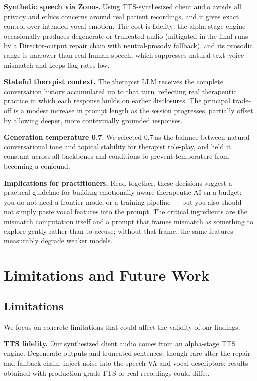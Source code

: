 \textbf{Synthetic speech via Zonos.} Using TTS-synthesized client audio avoids all privacy and ethics concerns around real patient recordings, and it gives exact control over intended vocal emotion. The cost is fidelity: the alpha-stage engine occasionally produces degenerate or truncated audio (mitigated in the final runs by a Director-output repair chain with neutral-prosody fallback), and its prosodic range is narrower than real human speech, which suppresses natural text--voice mismatch and keeps flag rates low.

\textbf{Stateful therapist context.} The therapist LLM receives the complete conversation history accumulated up to that turn, reflecting real therapeutic practice in which each response builds on earlier disclosures. The principal trade-off is a modest increase in prompt length as the session progresses, partially offset by allowing deeper, more contextually grounded responses.

\textbf{Generation temperature 0.7.} We selected 0.7 as the balance between natural conversational tone and topical stability for therapist role-play, and held it constant across all backbones and conditions to prevent temperature from becoming a confound.

\textbf{Implications for practitioners.} Read together, these decisions suggest a practical guideline for building emotionally aware therapeutic AI on a budget: you do not need a frontier model or a training pipeline --- but you also should not simply paste vocal features into the prompt. The critical ingredients are the mismatch computation itself and a prompt that frames mismatch as something to explore gently rather than to accuse; without that frame, the same features measurably degrade weaker models.

\section{Limitations and Future Work}

\subsection{Limitations}

We focus on concrete limitations that could affect the validity of our findings.

\textbf{TTS fidelity.} Our synthesized client audio comes from an alpha-stage TTS engine. Degenerate outputs and truncated sentences, though rare after the repair-and-fallback chain, inject noise into the speech VA and vocal descriptors; results obtained with production-grade TTS or real recordings could differ.

